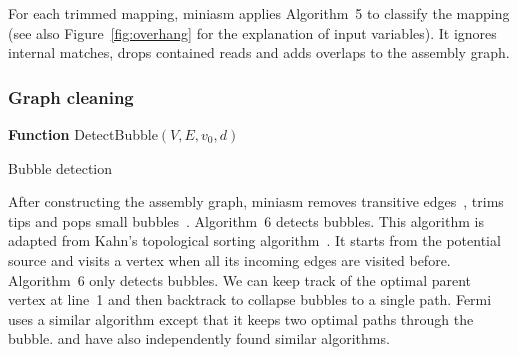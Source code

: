 \documentclass{bioinfo}
\begin{document}
\begin{methods}
For each trimmed mapping, miniasm applies Algorithm~5 to classify the mapping
(see also Figure~\ref{fig:overhang} for the explanation of input variables).
It ignores internal matches, drops contained reads and adds overlaps to the
assembly graph.


\subsubsection{Graph cleaning}

\begin{algorithm}[ht]
\DontPrintSemicolon
\footnotesize
{}
\BlankLine
\textbf{Function} {\sc DetectBubble}$(V,E,v_0,d)$
\caption{Bubble detection}
\end{algorithm}

After constructing the assembly graph, miniasm removes transitive
edges~\citep{Myers:2005bh}, trims tips and pops small
bubbles~\citep{Zerbino:2008uq}. Algorithm~6 detects bubbles. This algorithm is
adapted from Kahn's topological sorting algorithm~\citep{Kahn62aa}. It starts
from the potential source and visits a vertex when all its incoming edges are
visited before. Algorithm~6 only detects bubbles. We can keep track of the
optimal parent vertex at line~1 and then backtrack to collapse bubbles to a
single path. Fermi~\citep{Li:2012fk} uses a similar algorithm except that it
keeps two optimal paths through the bubble.  \citet{DBLP:conf/wabi/OnoderaSS13}
and \citet{TCS15} have also independently found similar algorithms.


\end{methods}
\end{document}
